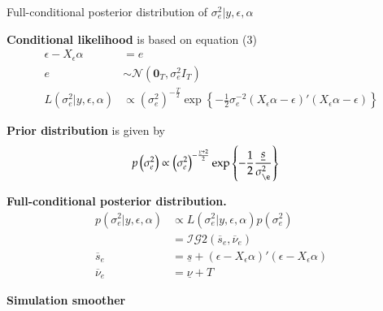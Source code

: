 \documentclass[notes,blackandwhite,mathsans,usenames,dvipsnames]{beamer}
\begin{document}
\begin{frame}{Full-conditional posterior distribution of $\sigma^2_e|y,\epsilon,\alpha$}

\small
\bigskip\textbf{Conditional likelihood} {\color{mcxs2}is based on equation} (3)
\begin{align*}
\epsilon-X_\epsilon \alpha &=e\\
e  &\sim\mathcal{N}\left(\mathbf{0}_T, \sigma^2_e I_T\right)\\
L\left(\sigma^2_e|y,\epsilon,\alpha\right)&\propto \left(\sigma^2_e\right)^{-\frac{T}{2}}\exp\left\{-\frac{1}{2}\sigma^{-2}_e\left(X_\epsilon \alpha-\epsilon\right)'\left(X_\epsilon \alpha-\epsilon\right)  \right\}
\end{align*}

\smallskip\textbf{Prior distribution} is given by
\begin{align*}
p\left(\sigma^2_e\right)&\propto\left(\sigma^2_e\right)^{-\frac{\underline{\nu}+2}{2}} \exp\left\{ -\frac{1}{2}\frac{\underline{s}}{\sigma^2_\e} \right\}
\end{align*}

\smallskip\textbf{Full-conditional posterior distribution.}
\begin{align*}
p\left( \sigma^2_e|y,\epsilon,\alpha \right) &\propto L\left(\sigma^2_e|y,\epsilon,\alpha\right)p\left(\sigma^2_e\right)\\
&= \mathcal{IG}2\left(\overline{s}_e,\overline{\nu}_e\right)\\
\overline{s}_e &= \underline{s} + (\epsilon-X_\epsilon \alpha)'(\epsilon-X_\epsilon \alpha)\\
\overline{\nu}_e &= \underline{\nu} + T
\end{align*}

\end{frame}








{
\begin{frame}

\begin{adjustwidth}{-0.5cm}{0cm}
\vspace{8.3cm}\Large
\textbf{{\color{mcxs2}Simulation} {\color{mcxs1}smoother}}
\end{adjustwidth}

\end{frame}
}
\end{document}
